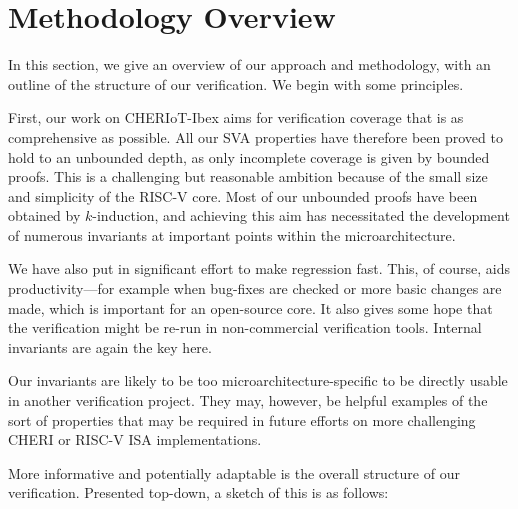 \documentclass[10pt,conference]{IEEEtran}
\begin{document}
\section{Methodology Overview}\label{sec:methodology}

In this section, we give an overview of our approach and methodology, with an
outline of the structure of our verification.  We begin with some
principles.

First, our work on CHERIoT-Ibex aims for verification coverage that is as
comprehensive as possible. All our SVA properties have therefore been
proved to hold to an unbounded depth, as only incomplete coverage is
given by bounded proofs. This is a challenging but reasonable
ambition because of the small size and simplicity of the RISC-V core.
Most of our unbounded proofs have been obtained by $k$-induction, and
achieving this aim has necessitated the development of numerous invariants
at important points within the microarchitecture.

We have also put in significant effort to make regression fast. This, of
course, aids productivity---for example when bug-fixes are checked or more
basic changes are made, which is important for an open-source core. It also
gives some hope that the verification might be re-run in non-commercial
verification tools. Internal invariants are again the key here.

Our invariants are likely to be too microarchitecture-specific to be
directly usable in another verification project. They may, however, be
helpful examples of the sort of properties that may be required in future
efforts on more challenging CHERI or RISC-V ISA implementations.

More informative and potentially adaptable is the overall structure of our
verification. Presented top-down, a sketch of this is as follows:
\end{document}
